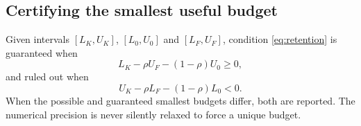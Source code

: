 \subsection{Certifying the smallest useful budget}
Given intervals $[L_K,U_K]$, $[L_0,U_0]$ and $[L_F,U_F]$, condition
\eqref{eq:retention} is guaranteed when
\begin{equation}
 L_K-\rho U_F-(1-\rho)U_0\ge0,
 \label{eq:pass}
\end{equation}
and ruled out when
\begin{equation}
 U_K-\rho L_F-(1-\rho)L_0<0.
 \label{eq:fail}
\end{equation}
When the possible and guaranteed smallest budgets differ, both are reported.
The numerical precision is never silently relaxed to force a unique budget.

